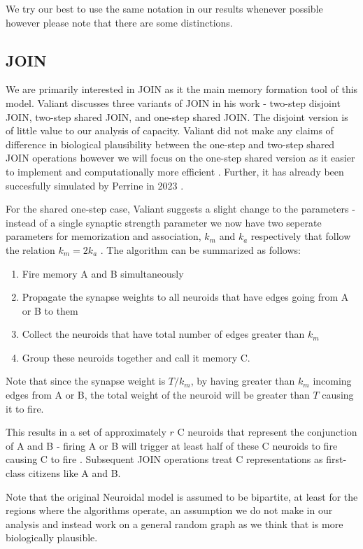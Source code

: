 We try our best to use the same notation in our results whenever possible however please note that there are some distinctions. 

\subsection{JOIN}

We are primarily interested in JOIN as it the main memory formation tool of this model. Valiant discusses three variants of JOIN in his work - two-step disjoint JOIN, two-step shared JOIN, and one-step shared JOIN. The disjoint version is of little value to our analysis of capacity. Valiant did not make any claims of difference in biological plausibility between the one-step and two-step shared JOIN operations however we will focus on the one-step shared version as it easier to implement and computationally more efficient \cite{valiant2005memorization}. Further, it has already been succesfully simulated by Perrine in 2023 \cite{perrine2023neural}. 

For the shared one-step case, Valiant suggests a slight change to the parameters - instead of a single synaptic strength parameter we now have two seperate parameters for memorization and association, $k_m$ and $k_a$ respectively that follow the relation $k_m = 2 k_a$ \cite{valiant2005memorization}. The algorithm can be summarized as follows:
\begin{enumerate}
    \item Fire memory A and B simultaneously
    \item Propagate the synapse weights to all neuroids that have edges going from A or B to them
    \item Collect the neuroids that have total number of edges greater than $k_m$
    \item Group these neuroids together and call it memory C. 
\end{enumerate}
Note that since the synapse weight is $T/k_m$, by having greater than $k_m$ incoming edges from A or B, the total weight of the neuroid will be greater than $T$ causing it to fire.

This results in a set of approximately $r$ C neuroids that represent the conjunction of A and B - firing A or B will trigger at least half of these C neuroids to fire causing C to fire \cite{valiant2005memorization}. Subsequent JOIN operations treat C representations as first-class citizens like A and B.

Note that the original Neuroidal model is assumed to be bipartite, at least for the regions where the algorithms operate, an assumption we do not make in our analysis and instead work on a general random graph as we think that is more biologically plausible. 

